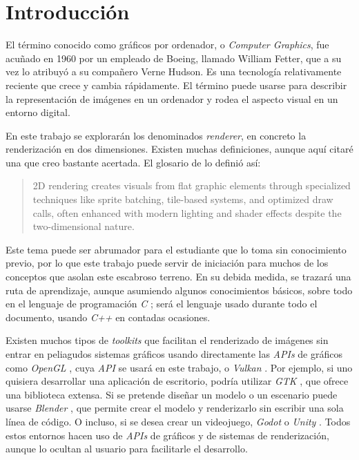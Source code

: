 \chapter{Introducción}\label{cap:introduccion}

El término conocido como gráficos por ordenador, o \textit{Computer Graphics}, fue acuñado en 1960 por un empleado de Boeing, llamado William Fetter, que a su vez lo atribuyó a su compañero Verne Hudson. Es una tecnología relativamente reciente que crece y cambia rápidamente. El término puede usarse para describir la representación de imágenes en un ordenador y rodea el aspecto visual en un entorno digital.

En este trabajo se explorarán los denominados \textit{renderer}, en concreto la renderización en dos dimensiones. Existen muchas definiciones, aunque aquí citaré una que creo bastante acertada.
El glosario de \cite{webUnityRenderDef} lo definió así:

\blockquote{2D rendering creates visuals from flat graphic elements through specialized techniques like sprite batching, tile-based systems, and optimized draw calls, often enhanced with modern lighting and shader effects despite the two-dimensional nature.}

Este tema puede ser abrumador para el estudiante que lo toma sin conocimiento previo, por lo que este trabajo puede servir de iniciación para muchos de los conceptos que asolan este escabroso terreno. En su debida medida, se trazará una ruta de aprendizaje, aunque asumiendo algunos conocimientos básicos, sobre todo en el lenguaje de programación \textit{C} \cite{bookCProgrammingLang}; será el lenguaje usado durante todo el documento, usando \textit{C++} en contadas ocasiones.

Existen muchos tipos de \textit{toolkits} que facilitan el renderizado de imágenes sin entrar en peliagudos sistemas gráficos usando directamente las \textit{APIs} de gráficos como \textit{OpenGL} \cite{webKhronosOpenGL}, cuya \textit{API} se usará en este trabajo, o \textit{Vulkan} \cite{webKhronosVulkan}. Por ejemplo, si uno quisiera desarrollar una aplicación de escritorio, podría utilizar \textit{GTK} \cite{webGTK}, que ofrece una biblioteca extensa. Si se pretende diseñar un modelo o un escenario puede usarse \textit{Blender} \cite{webBlender}, que permite crear el modelo y renderizarlo sin escribir una sola línea de código. O incluso, si se desea crear un videojuego, \textit{Godot} \cite{webGodot} o \textit{Unity} \cite{webUnity}. Todos estos entornos hacen uso de \textit{APIs} de gráficos y de sistemas de renderización, aunque lo ocultan al usuario para facilitarle el desarrollo.

